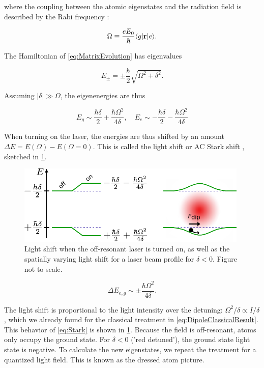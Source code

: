 where the coupling between the atomic eigenstates and the radiation field is described by the Rabi frequency \cite{Metcalf1999}:

\begin{equation}\label{eq:RabiFrequencyMain}
	\Omega \equiv \frac{e E_0}{\hbar} \langle g\rvert\mathbf{r}\lvert e\rangle.
\end{equation}

The Hamiltonian of \cref{eq:MatrixEvolution} has eigenvalues 

\begin{equation}\label{eq:EigenValues}
	E_{\pm} = \pm
	\frac{\hbar}{2} \sqrt{\Omega^2+\delta^2}.
\end{equation}

Assuming $|\delta| \gg \Omega$, the eigenenergies are thus 

\begin{equation}\label{eq:SemiClassicalEigenvalues}
	E_g \sim  \frac{\hbar \delta}{2} +\frac{\hbar \Omega^2}{4 \delta}, \quad
	E_e \sim -\frac{\hbar \delta}{2} -\frac{\hbar \Omega^2}{4 \delta}
\end{equation}

When turning on the laser, the energies are thus shifted by an amount $\Delta E = E(\Omega)-E(\Omega=0)$. This is called the light shift or AC Stark shift \cite{Metcalf1999}, sketched in \cref{fig:DipoleForce}.

\begin{figure}
    \centering
	\includegraphics[height=3.8cm]{figures/LightShift.pdf}
	\caption{Light shift when the off-resonant laser is turned on, as well as the spatially varying light shift for a laser beam profile for $\delta<0$. Figure not to scale.}
	\label{fig:DipoleForce}
\end{figure}

\begin{equation}\label{eq:Stark}
	\Delta E_{e,g} \sim \pm \frac{\hbar \Omega^2}{4 \delta}.
\end{equation}

The light shift is proportional to the light intensity over the detuning: $\Omega^2 / \delta \propto I / \delta$, which we already found for the classical treatment in \cref{eq:DipoleClassicalResult}. This behavior of \cref{eq:Stark} is shown in \cref{fig:DipoleForce}. Because the field is off-resonant, atoms only occupy the ground state. For $\delta <0$ ('red detuned'), the ground state light state is negative. To calculate the new eigenstates, we repeat the treatment for a quantized light field. This is known as the dressed atom picture.

